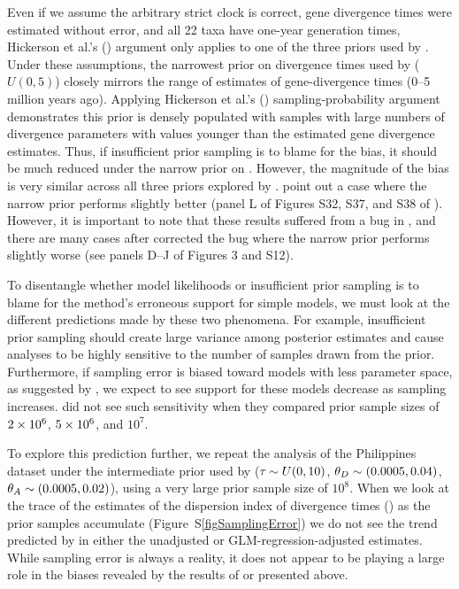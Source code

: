 Even if we assume the arbitrary strict clock is correct, gene divergence times
were estimated without error, and all 22 taxa have one-year generation times,
Hickerson et al.'s
(\citeyear{Hickerson2013}) argument only applies to one of the three priors
used by \citet{Oaks2012}.
Under these assumptions, the narrowest prior on divergence times used by
\citet{Oaks2012} ($U(0, 5)$) closely mirrors the range of estimates of
gene-divergence times (0--5 million years ago).
Applying Hickerson et al.'s (\citeyear{Hickerson2013}) sampling-probability
argument demonstrates this prior is densely populated with samples with large
numbers of divergence parameters with values younger than the estimated gene
divergence estimates.
Thus, if insufficient prior sampling is to blame for the bias, it should be
much reduced under the narrow prior on \divt{}.
However, the magnitude of the bias is very similar across all three priors
explored by \citet{Oaks2012}.
\citet{Hickerson2013} point out a case where the narrow prior performs
slightly better (panel L of Figures S32, S37, and S38 of \citet{Oaks2012}).
However, it is important to note that these results suffered from a bug
in \msb, and there are many cases after \citet{Oaks2012} corrected the 
bug where the narrow prior performs slightly worse (see panels D--J of
Figures 3 and S12).

To disentangle whether model likelihoods or insufficient prior sampling is to
blame for the method's erroneous support for simple models, we must look at the
different predictions made by these two phenomena.
For example, insufficient prior sampling should create large variance among
posterior estimates and cause analyses to be highly sensitive to the number of
samples drawn from the prior.
Furthermore, if sampling error is biased toward models with less
parameter space, as suggested by \citet{Hickerson2013}, we expect to see
support for these models decrease as sampling increases.
\citet{Oaks2012} did not see such sensitivity when they compared prior sample
sizes of $2\times 10^{6}$, $5\times 10^{6}$, and $10^7$.

To explore this prediction further, we repeat the analysis of the Philippines
dataset under the intermediate prior used by \citet{Oaks2012} ($\tau_{} \sim
U(0, 10)$, $\meanDescendantTheta{} \sim (0.0005, 0.04)$, $\ancestralTheta{}
\sim (0.0005, 0.02)$), using a very large prior sample size of $10^8$.
When we look at the trace of the estimates of the dispersion index of
divergence times (\vmratio{}) as the prior samples accumulate
(Figure~S\ref{figSamplingError}) we do not see the trend predicted by
\citet{Hickerson2013} in either the unadjusted or GLM-regression-adjusted
estimates.
While sampling error is always a reality, it does not appear to be playing a
large role in the biases revealed by the results of \citet{Oaks2012} or
presented above.

